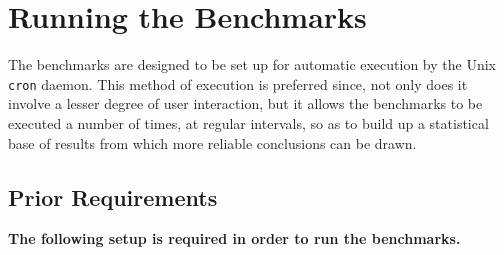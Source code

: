 
\section{Running the Benchmarks}

The benchmarks are designed to be set up for automatic execution by the
Unix {\tt cron} daemon. This method of execution is preferred since,
not only does it involve a lesser degree of user interaction, but it
allows the benchmarks to be executed a number of times, at regular
intervals, so as to build up a statistical base of results from which
more reliable conclusions can be drawn.

\subsection{Prior Requirements}

{\bf The following setup is required in order to run the benchmarks.}

